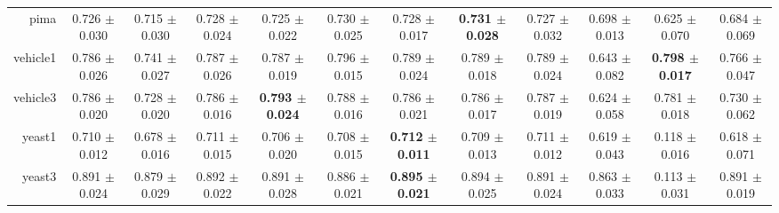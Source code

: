 \begin{table}[!ht]
{\begin{tabular}{r c c c c c c c c c c c}
pima & 0.726 $\pm$ 0.030 & 0.715 $\pm$ 0.030 & 0.728 $\pm$ 0.024 & 0.725 $\pm$ 0.022 & 0.730 $\pm$ 0.025 & 0.728 $\pm$ 0.017 & \textbf{0.731 $\pm$ 0.028} & 0.727 $\pm$ 0.032 & 0.698 $\pm$ 0.013 & 0.625 $\pm$ 0.070 & 0.684 $\pm$ 0.069 \\
vehicle1 & 0.786 $\pm$ 0.026 & 0.741 $\pm$ 0.027 & 0.787 $\pm$ 0.026 & 0.787 $\pm$ 0.019 & 0.796 $\pm$ 0.015 & 0.789 $\pm$ 0.024 & 0.789 $\pm$ 0.018 & 0.789 $\pm$ 0.024 & 0.643 $\pm$ 0.082 & \textbf{0.798 $\pm$ 0.017} & 0.766 $\pm$ 0.047 \\
vehicle3 & 0.786 $\pm$ 0.020 & 0.728 $\pm$ 0.020 & 0.786 $\pm$ 0.016 & \textbf{0.793 $\pm$ 0.024} & 0.788 $\pm$ 0.016 & 0.786 $\pm$ 0.021 & 0.786 $\pm$ 0.017 & 0.787 $\pm$ 0.019 & 0.624 $\pm$ 0.058 & 0.781 $\pm$ 0.018 & 0.730 $\pm$ 0.062 \\
yeast1 & 0.710 $\pm$ 0.012 & 0.678 $\pm$ 0.016 & 0.711 $\pm$ 0.015 & 0.706 $\pm$ 0.020 & 0.708 $\pm$ 0.015 & \textbf{0.712 $\pm$ 0.011} & 0.709 $\pm$ 0.013 & 0.711 $\pm$ 0.012 & 0.619 $\pm$ 0.043 & 0.118 $\pm$ 0.016 & 0.618 $\pm$ 0.071 \\
yeast3 & 0.891 $\pm$ 0.024 & 0.879 $\pm$ 0.029 & 0.892 $\pm$ 0.022 & 0.891 $\pm$ 0.028 & 0.886 $\pm$ 0.021 & \textbf{0.895 $\pm$ 0.021} & 0.894 $\pm$ 0.025 & 0.891 $\pm$ 0.024 & 0.863 $\pm$ 0.033 & 0.113 $\pm$ 0.031 & 0.891 $\pm$ 0.019 \\
\end{tabular}}
\end{table}
